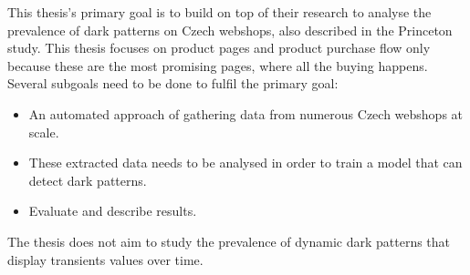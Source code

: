 
This thesis's primary goal is to build on top of their research to analyse the prevalence of dark patterns on Czech webshops, also described in the Princeton study\cite{dark-patterns-at-scale}. This thesis focuses on product pages and product purchase flow only because these are the most promising pages, where all the buying happens. Several subgoals need to be done to fulfil the primary goal:
\begin{itemize}
    \item An automated approach of gathering data from numerous Czech webshops at scale.
    \item These extracted data needs to be analysed in order to train a model that can detect dark patterns.
    \item Evaluate and describe results.
\end{itemize}

The thesis does not aim to study the prevalence of dynamic dark patterns that display transients values over time.